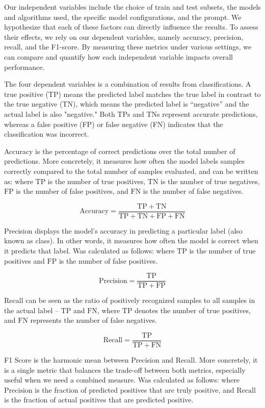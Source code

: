 Our independent variables include the choice of train and test subsets, the models and algorithms used, the specific model configurations, and the prompt. We hypothesize that each of these factors can directly influence the results. To assess their effects, we rely on our dependent variables, namely accuracy, precision, recall, and the F1-score. By measuring these metrics under various settings, we can compare and quantify how each independent variable impacts overall performance.

The four dependent variables is a combination of results from classifications.  A true positive (TP) means the predicted label matches the true label in contrast  to the true negative (TN), which means the predicted label is “negative” and the  actual label is also "negative." Both TPs and TNs represent accurate predictions,  whereas a false positive (FP) or false negative (FN) indicates that the  classification was incorrect.

\medskip
Accuracy is the percentage of correct predictions over the total number of  predictions. More concretely, it measures how often the model labels samples  correctly compared to the total number of samples evaluated, and can be written  as: where $\mathrm{TP}$ is the number of true positives, $\mathrm{TN}$ is the  number of true negatives, $\mathrm{FP}$ is the number of false positives,  and $\mathrm{FN}$ is the number of false negatives.

$$
\mathrm{Accuracy} = \frac{\mathrm{TP} + \mathrm{TN}}
{\mathrm{TP} + \mathrm{TN} + \mathrm{FP} + \mathrm{FN}}
$$

\medskip
Precision displays the model’s accuracy in predicting a particular label (also known as class).  In other words, it measures how often the model is correct when it predicts that label.  Was calculated as follows: where $\mathrm{TP}$ is the number of true positives and $\mathrm{FP}$ is the  number of false positives.

$$
\mathrm{Precision} 
= \frac{\mathrm{TP}}{\mathrm{TP} + \mathrm{FP}}
$$

\medskip
Recall can be seen as the ratio of positively recognized samples to all samples  in the actual label -- $\mathrm{TP}$ and $\mathrm{FN}$, where $\mathrm{TP}$ denotes the number of true positives, and $\mathrm{FN}$ represents the number of false negatives.

$$
\mathrm{Recall} = \frac{\mathrm{TP}}{\mathrm{TP} + \mathrm{FN}}
$$

\medskip
F1 Score is the harmonic mean between Precision and Recall. More concretely, it is a single metric  that balances the trade-off between both metrics, especially useful when we need a combined measure.  Was calculated as follows: where $\mathrm{Precision}$ is the fraction of predicted positives that are  truly positive, and $\mathrm{Recall}$ is the fraction of actual positives that are predicted positive.

